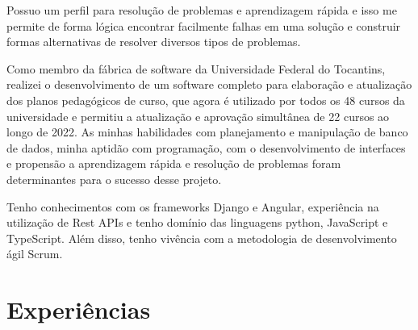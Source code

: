 \documentclass[a4paper,12pt]{article}
\begin{document}
Possuo um perfil para resolução de problemas e aprendizagem rápida e isso me permite de forma lógica encontrar facilmente falhas em uma solução e construir formas alternativas de resolver diversos tipos de problemas.

Como membro da fábrica de software da Universidade Federal do Tocantins, realizei o desenvolvimento de um software completo para elaboração e atualização dos planos pedagógicos de curso, que agora é utilizado por todos os 48 cursos da universidade e permitiu a atualização e aprovação simultânea de 22 cursos ao longo de 2022. As minhas habilidades com planejamento e manipulação de banco de dados, minha aptidão com programação, com o desenvolvimento de interfaces e propensão a aprendizagem rápida e resolução de problemas foram determinantes para o sucesso desse projeto.

Tenho conhecimentos com os frameworks Django e Angular, experiência na utilização de Rest APIs e tenho domínio das linguagens python, JavaScript e TypeScript. Além disso, tenho vivência com a metodologia de desenvolvimento ágil Scrum.
\section{Experiências}
\end{document}
